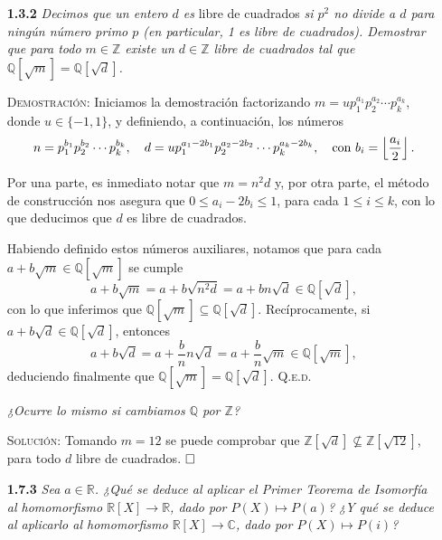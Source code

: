 \documentclass{article}
\begin{document}
\begin{enumerate}
    \vspace{12px}

    \item[\textbf{1.3.2}] \textit{Decimos que un entero $d$ es} libre de cuadrados \textit{si $p^2$ no divide a $d$ para ningún número primo $p$ (en particular, 1 es libre de cuadrados). Demostrar que para todo $m \in \mathbb{Z}$ existe un $d \in \mathbb{Z}$ libre de cuadrados tal que $\mathbb{Q}[\sqrt{m}] = \mathbb{Q}[\sqrt{d}]$.}
    
    \vspace{7px}

    \textsc{Demostración}: Iniciamos la demostración factorizando $m = up_1^{a_1}p_2^{a_2}\cdots p_k^{a_k}$, donde $u \in \{-1, 1\}$, y definiendo, a continuación, los números \[n = p_1^{b_1}p_2^{b_2}\cdots p_k^{b_k}, \hspace{10px} d = up_1^{a_1 - 2b_1}p_2^{a_2 - 2b_2}\cdots p_k^{a_k - 2b_k}, \hspace{10px} \text{con } b_i = \left\lfloor \frac{a_i}{2}\right\rfloor.\]

    Por una parte, es inmediato notar que $m = n^2d$ y, por otra parte, el método de construcción nos asegura que $0 \leq a_i - 2b_i \leq 1$, para cada $1 \leq i \leq k$, con lo que deducimos que $d$ es libre de cuadrados.

    Habiendo definido estos números auxiliares, notamos que para cada $a + b\sqrt{m} \in \mathbb{Q}[\sqrt{m}]$ se cumple \[a + b\sqrt{m} = a + b\sqrt{n^2d} = a + bn\sqrt{d} \in \mathbb{Q}[\sqrt{d}],\] con lo que inferimos que $\mathbb{Q}[\sqrt{m}] \subseteq \mathbb{Q}[\sqrt{d}]$. Recíprocamente, si $a + b\sqrt{d} \in \mathbb{Q}[\sqrt{d}]$, entonces \[a + b\sqrt{d} = a + \frac{b}{n}n\sqrt{d} = a + \frac{b}{n}\sqrt{m} \in \mathbb{Q}[\sqrt{m}],\] deduciendo finalmente que $\mathbb{Q}[\sqrt{m}] = \mathbb{Q}[\sqrt{d}]$. \hfill{\textsc{Q.e.d.}}

    \vspace{7px}

    \textit{¿Ocurre lo mismo si cambiamos $\mathbb{Q}$ por $\mathbb{Z}$?}

    \vspace{7px}

    \textsc{Solución}: Tomando $m = 12$ se puede comprobar que $\mathbb{Z}[\sqrt{d}] \not\subseteq \mathbb{Z}[\sqrt{12}]$, para todo $d$ libre de cuadrados. $\hfill\square$

    \newpage

    \item[\textbf{1.7.3}] \textit{Sea $a \in \mathbb{R}$. ¿Qué se deduce al aplicar el Primer Teorema de Isomorfía al homomorfismo $\mathbb{R}[X] \to \mathbb{R}$, dado por $P(X) \mapsto P(a)$? ¿Y qué se deduce al aplicarlo al homomorfismo $\mathbb{R}[X] \to \mathbb{C}$, dado por $P(X) \mapsto P(i)$?}


\end{enumerate}
\end{document}
